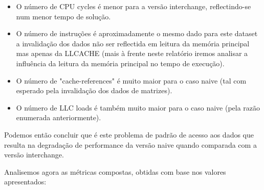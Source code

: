 \documentclass[conference,compsoc]{IEEEtran}
\begin{document}
\begin{itemize}
\item O número de CPU cycles é menor para a versão interchange, reflectindo-se num menor tempo de solução.
\item O número de instruções é aproximadamente o mesmo dado para este dataset a invalidação dos dados não ser reflectida em leitura da memória principal mas apenas da LLCACHE (mais à frente neste relatório iremos analisar a influência da leitura da memória principal no tempo de execução).
\item O número de "cache-references" é muito maior para o caso naive (tal com esperado pela invalidação dos dados de matrizes).
\item O número de LLC loads é também muito maior para o caso naive (pela razão enumerada anteriormente).
\end{itemize}
Podemos então concluir que é este problema de padrão de acesso aos dados que resulta na degradação de performance da versão naive quando comparada com a versão interchange.\par 
Analisemos agora as métricas compostas, obtidas com base nos valores apresentados:
\end{document}
